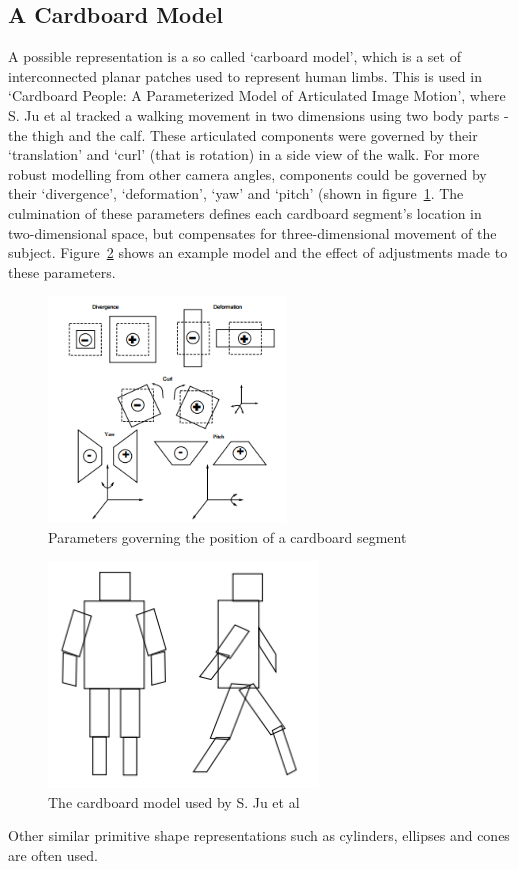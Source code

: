 \subsection{A Cardboard Model}

A possible representation is a so called `carboard model', which is a set of interconnected planar patches used to represent human limbs. This is used in `Cardboard People: A Parameterized Model of Articulated Image Motion'\cite{cardboardpeople}, where S. Ju et al tracked a walking movement in two dimensions using two body parts - the thigh and the calf. These articulated components were governed by their `translation' and `curl' (that is rotation) in a side view of the walk. For more robust modelling from other camera angles, components could be governed by their `divergence', `deformation', `yaw' and `pitch' (shown in figure~\ref{fig:cardboardparams}. The culmination of these parameters defines each cardboard segment's location in two-dimensional space, but compensates for three-dimensional movement of the subject. Figure~\ref{fig:cardboardmodel} shows an example model and the effect of adjustments made to these parameters.

\begin{figure}[H]
\centering
\includegraphics[height=6cm]{background/images/cardboard2}
\caption{Parameters governing the position of a cardboard segment}
\label{fig:cardboardparams}
\end{figure}

\begin{figure}[H]
\centering
\includegraphics[height=6cm]{background/images/cardboard}
\caption{The cardboard model used by S. Ju et al\cite{cardboardpeople}}
\label{fig:cardboardmodel}
\end{figure}

Other similar primitive shape representations such as cylinders, ellipses and cones are often used\cite{cvmocapsurvey}.